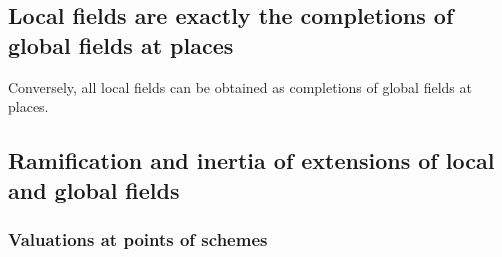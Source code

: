 \subsection{Local fields are exactly the completions of global fields at places}



\begin{remark}
    Conversely, all local fields can be obtained as completions of global fields at places.
\end{remark}










\subsection{Ramification and inertia of extensions of local and global fields}

















\subsubsection{Valuations at points of schemes}


